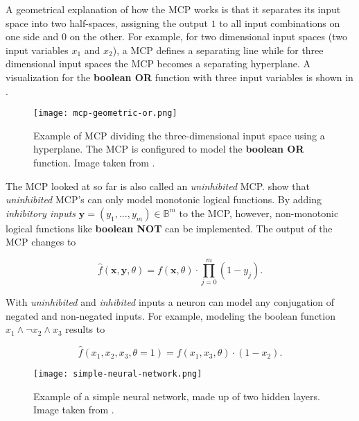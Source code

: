A geometrical explanation of how the MCP works is that it separates its input space into two half-spaces, assigning the output $1$ to all input combinations on one side and $0$ on the other.
For example, for two dimensional input spaces (two input variables $x_1$ and $x_2$), a MCP defines a separating line while for three dimensional input spaces the MCP becomes a separating hyperplane.
A visualization for the \textbf{boolean OR} function with three input variables is shown in .

\begin{figure}[htb!]
    \centering
    \texttt{[image: mcp-geometric-or.png]}
    \caption{Example of MCP dividing the three-dimensional input space using a hyperplane. The MCP is configured to model the \textbf{boolean OR} function. Image taken from \cite{rojas_neural_1996}.}
    \label{fig:mcp-geometric-or}
\end{figure}

The MCP looked at so far is also called an \textit{uninhibited} MCP.
\cite{rojas_neural_1996} show that \textit{uninhibited} MCP's can only model monotonic logical functions.
By adding \textit{inhibitory inputs} $\bm{y} = (y_1, \dots, y_m) \in \mathbb{B}^m$ to the MCP, however, non-monotonic logical functions like \textbf{boolean NOT} can be implemented.
The output of the MCP changes to

\begin{equation}
    \hat{f}(\bm{x}, \bm{y}, \theta) = f(\bm{x}, \theta) \cdot \prod_{j = 0}^m (1 - y_j).
\end{equation}

With \textit{uninhibited} and \textit{inhibited} inputs a neuron can model any conjugation of negated and non-negated inputs.
For example, modeling the boolean function $x_1 \wedge \neg x_2 \wedge x_3$ results to

\begin{equation}
    \label{eq:conjunction-negated}
    \hat{f}(x_1, x_2, x_3, \theta=1) = f(x_1, x_3, \theta) \cdot (1 - x_2).
\end{equation}

\begin{figure}[htb!]
    \centering
    \texttt{[image: simple-neural-network.png]}
    \caption{Example of a simple neural network, made up of two hidden layers. Image taken from \cite{dertat_applied_2017-1}.}
    \label{fig:simple-neural-network}
\end{figure}

